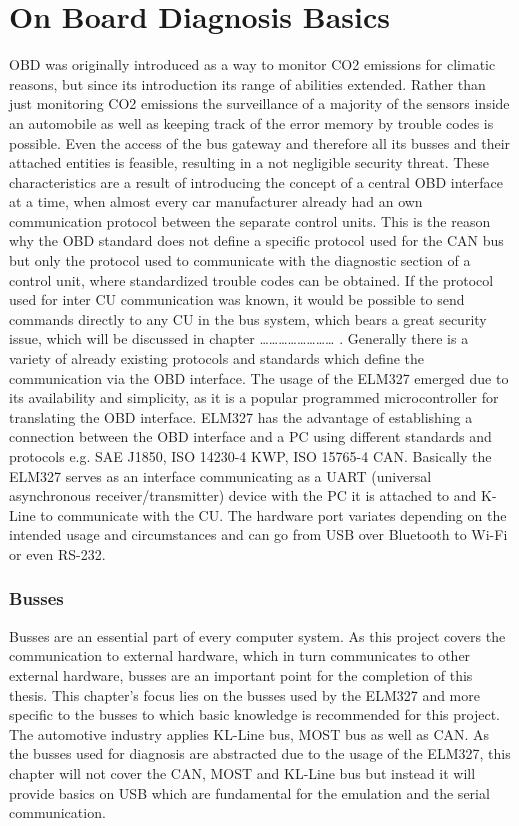 

\chapter{On Board Diagnosis Basics}
OBD was originally introduced as a way to monitor CO2 emissions for climatic reasons, but since its introduction its range of abilities 
extended. Rather than just monitoring CO2 emissions the surveillance of a majority of the sensors inside an automobile as well as 
keeping track of the error memory by trouble codes is possible. Even the access of the bus gateway and therefore all its busses and 
their attached entities is feasible, 
resulting in a not negligible security threat. These characteristics are a result of introducing the concept of a central OBD interface at a time, 
when almost every car manufacturer already had an own communication protocol between the separate control units.
This is the reason why the OBD standard does not define a specific protocol used for the CAN bus but only the protocol used to communicate with the diagnostic section of a control unit, where standardized trouble codes can be obtained. If the protocol used for inter CU communication was known, it would be possible to send commands directly to any CU in the bus system, which bears a great security issue, which will be discussed in chapter …………………… .
Generally there is a variety of already existing protocols and standards which define the communication via the OBD interface. The usage of the ELM327 
emerged due to its availability and simplicity, as it is a popular programmed microcontroller for translating the OBD interface. ELM327 has the 
advantage of establishing a connection between the OBD interface and a PC using different standards and protocols e.g. SAE J1850, ISO 14230-4 KWP, 
ISO 15765-4 CAN. Basically the ELM327 serves as an interface communicating as a UART (universal asynchronous receiver/transmitter) device with the 
PC it is attached to and K-Line to communicate with the CU. The hardware port variates depending on the intended usage and circumstances and can go 
from USB over Bluetooth to Wi-Fi or even RS-232. 

\subsection{Busses}
Busses are an essential part of every computer system. As this project covers the communication to external hardware, which in turn communicates to other external hardware, busses are an important point for the completion of this thesis. This chapter’s focus lies on the busses used by the ELM327 and more specific to the busses to which basic knowledge is recommended for this project.  
The automotive industry applies KL-Line bus, MOST bus as well as CAN. As the busses used for diagnosis are abstracted due to the usage of the ELM327, this chapter will not cover the CAN, MOST and KL-Line bus but instead it will provide basics on USB which are fundamental for the emulation and the serial communication.

